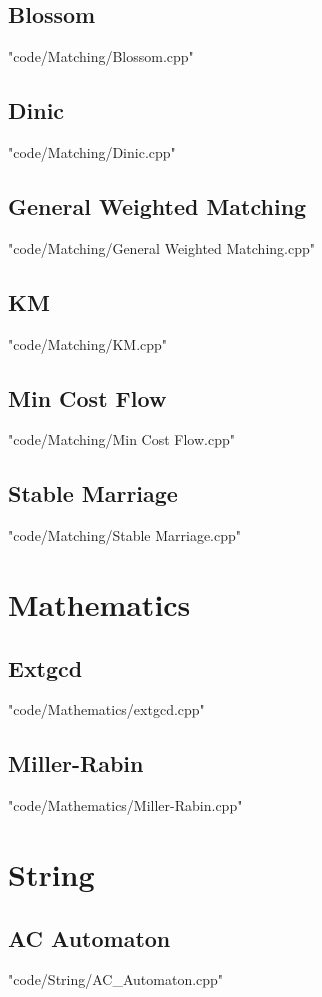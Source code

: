 \documentclass [landscape,8pt,a4paper,twocolumn]{article}
\begin{document}
\subsection{Blossom}
 {"code/Matching/Blossom.cpp"}
\subsection{Dinic}
 {"code/Matching/Dinic.cpp"}
\subsection{General Weighted Matching}
 {"code/Matching/General Weighted Matching.cpp"}
\subsection{KM}
 {"code/Matching/KM.cpp"}
\subsection{Min Cost Flow}
 {"code/Matching/Min Cost Flow.cpp"}
\subsection{Stable Marriage}
 {"code/Matching/Stable Marriage.cpp"}
\section{Mathematics}
\subsection{Extgcd}
 {"code/Mathematics/extgcd.cpp"}
\subsection{Miller-Rabin}
 {"code/Mathematics/Miller-Rabin.cpp"}
\section{String}
\subsection{AC Automaton}
 {"code/String/AC_Automaton.cpp"}
\end{document}
